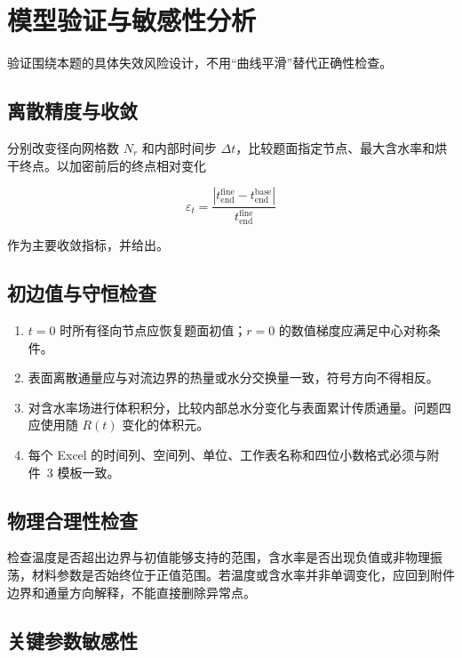 \section{模型验证与敏感性分析}

验证围绕本题的具体失效风险设计，不用“曲线平滑”替代正确性检查。

\subsection{离散精度与收敛}

分别改变径向网格数 $N_r$ 和内部时间步 $\Delta t$，比较题面指定节点、最大含水率和烘干终点。以加密前后的终点相对变化

\begin{equation}
  \varepsilon_t=
  \frac{\left|t_{\mathrm{end}}^{\mathrm{fine}}-t_{\mathrm{end}}^{\mathrm{base}}\right|}
  {t_{\mathrm{end}}^{\mathrm{fine}}}
  \label{eq:convergence}
\end{equation}

作为主要收敛指标，并给出。

\subsection{初边值与守恒检查}

\begin{enumerate}
  \item $t=0$ 时所有径向节点应恢复题面初值；$r=0$ 的数值梯度应满足中心对称条件。
  \item 表面离散通量应与对流边界的热量或水分交换量一致，符号方向不得相反。
  \item 对含水率场进行体积积分，比较内部总水分变化与表面累计传质通量。问题四应使用随 $R(t)$ 变化的体积元。
  \item 每个 Excel 的时间列、空间列、单位、工作表名称和四位小数格式必须与附件~3 模板一致。
\end{enumerate}

\subsection{物理合理性检查}

检查温度是否超出边界与初值能够支持的范围，含水率是否出现负值或非物理振荡，材料参数是否始终位于正值范围。若温度或含水率并非单调变化，应回到附件边界和通量方向解释，不能直接删除异常点。

\subsection{关键参数敏感性}

